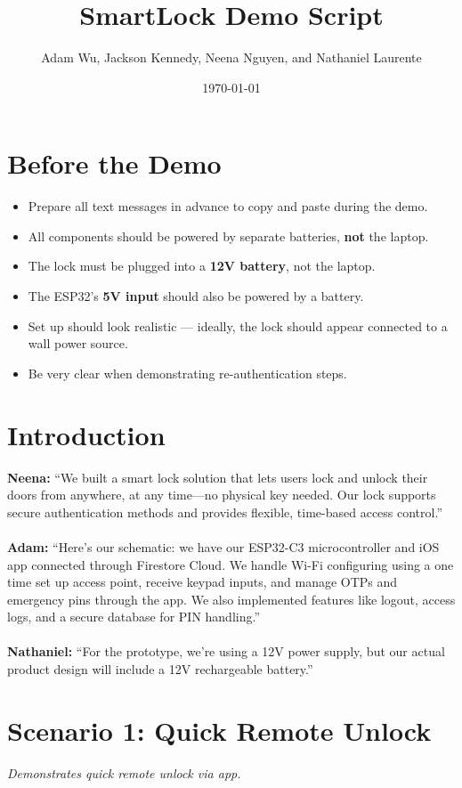 \documentclass[12pt]{article}
\title{ SmartLock Demo Script }
\author{ Adam Wu, Jackson Kennedy, Neena Nguyen, and Nathaniel Laurente }
\date{\today}
\begin{document}
\maketitle

\section*{Before the Demo}
\begin{itemize}[leftmargin=1.5em]
    \item Prepare all text messages in advance to copy and paste during the demo.
    \item All components should be powered by separate batteries, \textbf{not} the laptop.
    \item The lock must be plugged into a \textbf{12V battery}, not the laptop.
    \item The ESP32’s \textbf{5V input} should also be powered by a battery.
    \item Set up should look realistic — ideally, the lock should appear connected to a wall power source.
    \item Be very clear when demonstrating re-authentication steps.
\end{itemize}

\section*{Introduction}
\textbf{Neena:} 
“We built a smart lock solution that lets users lock and unlock their doors from anywhere, at any time—no physical key needed. Our lock supports secure authentication methods and provides flexible, time-based access control.”\\
\\
\textbf{Adam:} 
“Here’s our schematic: we have our ESP32-C3 microcontroller and iOS app connected through Firestore Cloud. We handle Wi-Fi configuring using a one time set up access point, receive keypad inputs, and manage OTPs and emergency pins through the app. We also implemented features like logout, access logs, and a secure database for PIN handling.”\\
\\
\textbf{Nathaniel:}
“For the prototype, we’re using a 12V power supply, but our actual product design will include a 12V rechargeable battery.”\\

\section{Scenario 1: Quick Remote Unlock}
\textit{Demonstrates quick remote unlock via app.}
\end{document}
